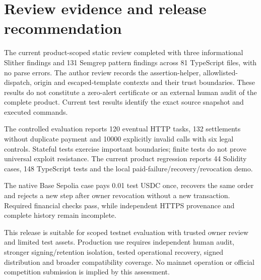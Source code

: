\section{Review evidence and release recommendation}
The current product-scoped static review completed with three informational Slither findings and 131 Semgrep pattern findings across 81 TypeScript files, with no parse errors. The author review records the assertion-helper, allowlisted-dispatch, origin and escaped-template contexts and their trust boundaries. These results do not constitute a zero-alert certificate or an external human audit of the complete product. Current test results identify the exact source snapshot and executed commands.\citep{staticreview}

The controlled evaluation reports 120 eventual HTTP tasks, 132 settlements without duplicate payment and 10000 explicitly invalid calls with six legal controls. Stateful tests exercise important boundaries; finite tests do not prove universal exploit resistance.\citep{eval,formal} The current product regression reports 44 Solidity cases, 148 TypeScript tests and the local paid-failure/recovery/revocation demo.\citep{repro}

The native Base Sepolia case pays 0.01 test USDC once, recovers the same order and rejects a new step after owner revocation without a new transaction. Required financial checks pass, while independent HTTPS provenance and complete history remain incomplete.\citep{case}

This release is suitable for scoped testnet evaluation with trusted owner review and limited test assets. Production use requires independent human audit, stronger signing/retention isolation, tested operational recovery, signed distribution and broader compatibility coverage. No mainnet operation or official competition submission is implied by this assessment.
